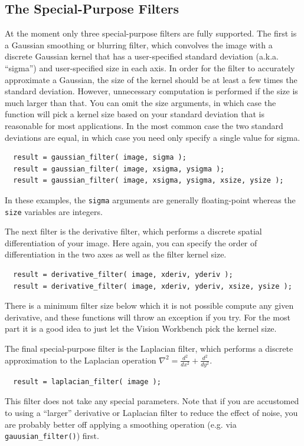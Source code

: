 \subsection{The Special-Purpose Filters}

At the moment only three special-purpose filters are fully supported.
The first is a Gaussian smoothing or blurring filter, which convolves
the image with a discrete Gaussian kernel that has a user-specified
standard deviation (a.k.a. ``sigma'') and user-specified size in each
axis. In order for the filter to accurately approximate a Gaussian,
the size of the kernel should be at least a few times the standard
deviation.  However, unnecessary computation is performed if the size
is much larger than that.  You can omit the size arguments, in which
case the function will pick a kernel size based on your standard
deviation that is reasonable for most applications.  In the most
common case the two standard deviations are equal, in which case you
need only specify a single value for sigma.
\begin{verbatim}
  result = gaussian_filter( image, sigma );
  result = gaussian_filter( image, xsigma, ysigma );
  result = gaussian_filter( image, xsigma, ysigma, xsize, ysize );
\end{verbatim}
In these examples, the \verb#sigma# arguments are generally
floating-point whereas the \verb#size# variables are integers.

The next filter is the derivative filter, which performs a 
discrete spatial differentiation of your image.  Here again, you 
can specify the order of differentiation in the two axes as well 
as the filter kernel size.
\begin{verbatim}
  result = derivative_filter( image, xderiv, yderiv );
  result = derivative_filter( image, xderiv, yderiv, xsize, ysize );
\end{verbatim}
There is a minimum filter size below which it is not possible compute
any given derivative, and these functions will throw an exception if
you try.  For the most part it is a good idea to just let the Vision
Workbench pick the kernel size.

The final special-purpose filter is the Laplacian filter, which 
performs a discrete approximation to the Laplacian operation
$\nabla^2=\frac{d^2}{dx^2}+\frac{d^2}{dy^2}$.
\begin{verbatim}
  result = laplacian_filter( image );
\end{verbatim}
This filter does not take any special parameters.  Note that if you 
are accustomed to using a ``larger'' derivative or Laplacian filter 
to reduce the effect of noise, you are probably better off applying 
a smoothing operation (e.g. via \verb#gauusian_filter()#) first.

